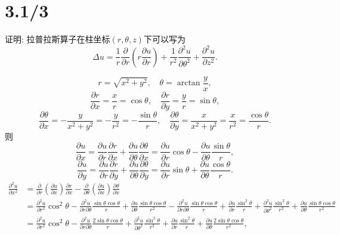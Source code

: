 \documentclass[11pt,a4paper]{article}
\begin{document}
\section{3.1/3}
\begin{problem}
证明: 拉普拉斯算子在柱坐标$(r,\theta,z)$下可以写为
$$\Delta u=\frac{1}{r}\frac{\partial}{\partial r}\left(r\frac{\partial u}{\partial r}\right)+\frac{1}{r^2}\frac{\partial^2u}{\partial\theta^2}+\frac{\partial^2u}{\partial z^2}.$$
\end{problem}

$$r=\sqrt{x^2+y^2},\quad \theta=\arctan\frac{y}{x},$$
$$\frac{\partial r}{\partial x}=\frac{x}{r}=\cos\theta,\quad\frac{\partial r}{\partial y}=\frac{y}{r}=\sin\theta,$$
$$\frac{\partial\theta}{\partial x}=-\frac{y}{x^2+y^2}=-\frac{y}{r^2}=-\frac{\sin\theta}{r},\quad\frac{\partial\theta}{\partial y}=\frac{x}{x^2+y^2}=\frac{x}{r^2}=\frac{\cos\theta}{r}.$$
则
$$\frac{\partial u}{\partial x}=\frac{\partial u}{\partial r}\frac{\partial r}{\partial x}+\frac{\partial u}{\partial\theta}\frac{\partial\theta}{\partial x}=\frac{\partial u}{\partial r}\cos\theta-\frac{\partial u}{\partial \theta}\frac{\sin\theta}{r},$$
$$\frac{\partial u}{\partial y}=\frac{\partial u}{\partial r}\frac{\partial r}{\partial y}+\frac{\partial u}{\partial\theta}\frac{\partial\theta}{\partial y}=\frac{\partial u}{\partial r}\sin\theta+\frac{\partial u}{\partial \theta}\frac{\cos\theta}{r}.$$
\begin{align*}
  \frac{\partial^2u}{\partial x^2}
   & =\frac{\partial}{\partial r}\left(\frac{\partial u}{\partial x}\right)\frac{\partial r}{\partial x}-\frac{\partial}{\partial\theta}\left(\frac{\partial u}{\partial x}\right)\frac{\partial\theta}{\partial x}                                                                                                 \\
   & =\frac{\partial^2u}{\partial r^2}\cos^2\theta-\frac{\partial^2u}{\partial r\partial\theta}\frac{\sin\theta\cos\theta}{r}+\frac{\partial u}{\partial\theta}\frac{\sin\theta\cos\theta}{r^2}
  -\frac{\partial^2u}{\partial r\partial\theta}\frac{\sin\theta\cos\theta}{r}+\frac{\partial u}{\partial r}\frac{\sin^2\theta}{r}+\frac{\partial^2u}{\partial\theta^2}\frac{\sin^2\theta}{r^2}+\frac{\partial u}{\partial\theta}\frac{\sin\theta\cos\theta}{r^2}                                                    \\
   & =\frac{\partial^2u}{\partial r^2}\cos^2\theta-\frac{\partial^2u}{\partial r\partial\theta}\frac{2\sin\theta\cos\theta}{r}+\frac{\partial^2u}{\partial\theta^2}\frac{\sin^2\theta}{r^2}+\frac{\partial u}{\partial r}\frac{\sin^2\theta}{r}+\frac{\partial u}{\partial\theta}\frac{2\sin\theta\cos\theta}{r^2},
\end{align*}
\end{document}
